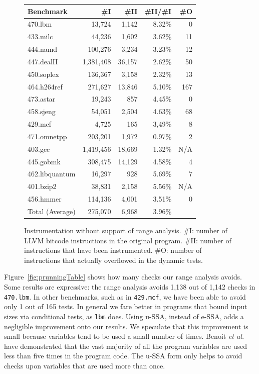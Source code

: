 \documentclass{sigplanconf}[10pt]
\begin{document}
\begin{figure}[htb]
\begin{center}
\begin{small}
\begin{tabular*}{\columnwidth}{@{\extracolsep{\fill}}|l|r|r|r|r|}
\hline
Benchmark      & \#I & \#II & \#II/\#I & \#O \\ \hline
470.lbm        & 13,724 & 1,142 & 8.32\% & 0 \\ \hline
433.milc       & 44,236 & 1,602 & 3.62\% & 11 \\ \hline
444.namd       & 100,276 & 3,234 & 3.23\% & 12 \\ \hline
447.dealII     & 1,381,408 & 36,157 & 2.62\% & 50 \\ \hline
450.soplex     & 136,367 & 3,158 & 2.32\% & 13 \\ \hline
464.h264ref    & 271,627 & 13,846 & 5.10\% & 167 \\ \hline
473.astar      & 19,243 & 857 & 4.45\% & 0 \\ \hline
458.sjeng      & 54,051 & 2,504 & 4.63\% & 68 \\ \hline
429.mcf        & 4,725 & 165 & 3,49\% & 8 \\ \hline
471.omnetpp    & 203,201 & 1,972 & 0.97\% & 2 \\ \hline
403.gcc        & 1,419,456 & 18,669 & 1.32\% & N/A \\ \hline
445.gobmk      & 308,475 & 14,129 & 4.58\% & 4 \\ \hline
462.libquantum & 16,297 & 928 & 5.69\% & 7 \\ \hline
401.bzip2      & 38,831 & 2,158 & 5.56\% & N/A \\ \hline
456.hmmer      & 114,136 & 4,001 & 3.51\% & 0 \\ \hline
\multicolumn{1}{|r|}{Total (Average)} & 275,070 & 6,968 & 3.96\% &  \\ \hline
\end{tabular*}
\end{small}
\end{center}
\caption{\label{fig:unprunedTable}
Instrumentation without support of range analysis.
\#I: number of LLVM bitcode instructions in the original program.
\#II: number of instructions that have been instrumented.
\#O: number of instructions that actually overflowed in the dynamic tests.}
\end{figure}

Figure~\ref{fig:prunningTable} shows how many checks our range analysis
avoids.
Some results are expressive: the range analysis avoids 1,138 out of 1,142 checks in
\texttt{470.lbm}.
In other benchmarks, such as in \texttt{429.mcf}, we have been able to
avoid only 1 out of 165 tests.
In general we fare better in programs that bound input sizes via conditional
tests, as \texttt{lbm} does.
Using u-SSA, instead of e-SSA, adds a negligible improvement onto our results.
We speculate that this improvement is small because variables tend to be used
a small number of times.
Benoit {\em et al.}~\cite{Benoit08} have demonstrated that the vast majority
of all the program variables are used less than five times in the program
code.
The u-SSA form only helps to avoid checks upon variables that are used more
than once.
\end{document}
